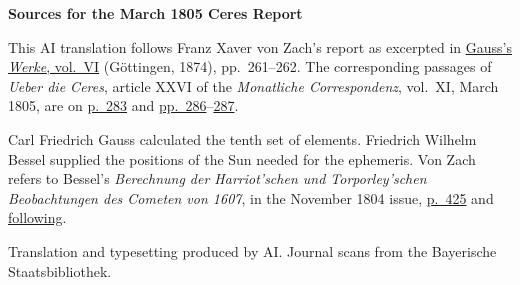 \clearpage\thispagestyle{empty}
\begin{center}\textbf{Sources for the March 1805 Ceres Report}\end{center}
\noindent This AI translation follows Franz Xaver von Zach’s report as excerpted in \href{https://gdz.sub.uni-goettingen.de/id/PPN236007467}{Gauss’s \textit{Werke}, vol.~VI} (Göttingen, 1874), pp.~261--262. The corresponding passages of \textit{Ueber die Ceres}, article XXVI of the \textit{Monatliche Correspondenz}, vol.~XI, March 1805, are on \href{https://www.digitale-sammlungen.de/en/view/bsb10538603?page=295}{p.~283} and \href{https://www.digitale-sammlungen.de/en/view/bsb10538603?page=298}{pp.~286}--\href{https://www.digitale-sammlungen.de/en/view/bsb10538603?page=299}{287}.
\par\smallskip\noindent Carl Friedrich Gauss calculated the tenth set of elements. Friedrich Wilhelm Bessel supplied the positions of the Sun needed for the ephemeris. Von Zach refers to Bessel’s \textit{Berechnung der Harriot’schen und Torporley’schen Beobachtungen des Cometen von 1607}, in the November 1804 issue, \href{https://www.digitale-sammlungen.de/en/view/bsb10538602?page=439}{p.~425} and \href{https://www.digitale-sammlungen.de/en/view/bsb10538602?page=440}{following}.
\par\smallskip\noindent Translation and typesetting produced by AI. Journal scans from the Bayerische Staatsbibliothek.
\clearpage
